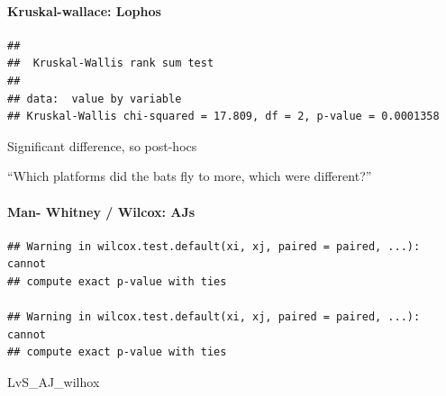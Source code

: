 \documentclass[]{article}
\newenvironment{Shaded}{\begin{snugshade}}{\end{snugshade}}
\newcommand{\KeywordTok}[1]{\textcolor[rgb]{0.13,0.29,0.53}{\textbf{{#1}}}}
\newcommand{\DataTypeTok}[1]{\textcolor[rgb]{0.13,0.29,0.53}{{#1}}}
\newcommand{\StringTok}[1]{\textcolor[rgb]{0.31,0.60,0.02}{{#1}}}
\newcommand{\NormalTok}[1]{{#1}}
\let\oldparagraph\paragraph
\renewcommand{\paragraph}[1]{\oldparagraph{#1}\mbox{}}
\begin{document}
\paragraph{Kruskal-wallace: Lophos}\label{kruskal-wallace-lophos}

\begin{Shaded}
\end{Shaded}

\begin{verbatim}
## 
##  Kruskal-Wallis rank sum test
## 
## data:  value by variable
## Kruskal-Wallis chi-squared = 17.809, df = 2, p-value = 0.0001358
\end{verbatim}

Significant difference, so post-hocs

``Which platforms did the bats fly to more, which were different?''

\paragraph{Man- Whitney / Wilcox: AJs}\label{man--whitney-wilcox-ajs}

\begin{Shaded}
\end{Shaded}

\begin{verbatim}
## Warning in wilcox.test.default(xi, xj, paired = paired, ...): cannot
## compute exact p-value with ties

## Warning in wilcox.test.default(xi, xj, paired = paired, ...): cannot
## compute exact p-value with ties
\end{verbatim}

\begin{Shaded}
\begin{Highlighting}[]
\NormalTok{LvS_AJ_wilhox}
\end{Highlighting}
\end{Shaded}
\end{document}
